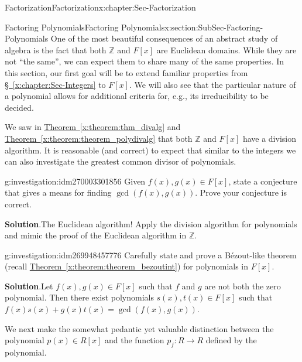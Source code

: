 \documentclass[oneside,10pt,]{book}
\numberwithin{equation}{section}
\def\Z{{\mathbb Z}}
\begin{document}
\begin{chapterptx}{Factorization}{}{Factorization}{}{}{x:chapter:Sec-Factorization}
%
%
\typeout{************************************************}
\typeout{************************************************}
%
\begin{sectionptx}{Factoring Polynomials}{}{Factoring Polynomials}{}{}{x:section:SubSec-Factoring-Polynomials}
One of the most beautiful consequences of an abstract study of algebra is the fact that both \(\Z\) and \(F[x]\) are Euclidean domains. While they are not ``the same'', we can expect them to share many of the same properties. In this section, our first goal will be to extend familiar properties from \hyperref[x:chapter:Sec-Integers]{§~\ref{x:chapter:Sec-Integers}} to \(F[x]\). We will also see that the particular nature of a polynomial allows for additional criteria for, e.g., its irreducibility to be decided.%
\par
We saw in \hyperref[x:theorem:thm_divalg]{Theorem~\ref{x:theorem:thm_divalg}} and \hyperref[x:theorem:theorem_polydivalg]{Theorem~\ref{x:theorem:theorem_polydivalg}} that both \(\Z\) and \(F[x]\) have a division algorithm. It is reasonable (and correct) to expect that similar to the integers we can also investigate the greatest common divisor of polynomials.%
\begin{investigation}{}{g:investigation:idm270003301856}%
Given \(f(x),g(x)\in F[x]\), state a conjecture that gives a means for finding \(\gcd(f(x),g(x))\). Prove your conjecture is correct.%
\par\smallskip%
\noindent\textbf{Solution}.\hypertarget{g:solution:idm270000862672}{}\quad{}The Euclidean algorithm! Apply the division algorithm for polynomials and mimic the proof of the Euclidean algorithm in \(\Z\).%
\end{investigation}
\begin{investigation}{}{g:investigation:idm269948457776}%
Carefully state and prove a Bézout-like theorem (recall \hyperref[x:theorem:theorem_bezoutint]{Theorem~\ref{x:theorem:theorem_bezoutint}}) for polynomials in \(F[x]\).%
\par\smallskip%
\noindent\textbf{Solution}.\hypertarget{g:solution:idm269948380880}{}\quad{}Let \(f(x),
g(x)\in F[x]\) such that \(f\) and \(g\) are not both the zero polynomial. Then there exist polynomials \(s(x),
t(x)\in F[x]\) such that \(f(x) s(x) + g(x) t(x) = \gcd(f(x),g(x))\).%
\end{investigation}
We next make the somewhat pedantic \textemdash{} yet valuable \textemdash{} distinction between the polynomial \(p(x)\in R[x]\) and the function \(p_f : R\to R\) defined by the polynomial.%

\end{sectionptx}
\end{chapterptx}
\end{document}
